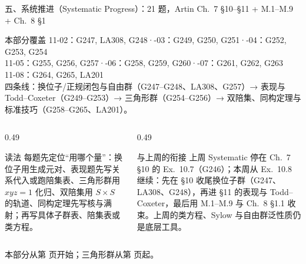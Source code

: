 \documentclass[aspectratio=169,10pt,fontset=none]{ctexbeamer}
\begin{document}
\begin{frame}[t]{五、系统推进（Systematic Progress）：21 题，Artin Ch.~7 \S10--\S11 + M.1--M.9 + Ch.~8 \S1}
  \label{sec:sys}
  \begin{block}{\footnotesize 本部分覆盖}
    \scriptsize
    11-02：G247, LA308, G248\quad·-03：G249, G250, G251\quad·-04：G252, G253, G254\\
    11-05：G255, G256, G257\quad·-06：G258, G259, G260\quad·-07：G261, G262, G263\\
    11-08：G264, G265, LA201\\[2pt]
    四条线：换位子/正规闭包与自由群（G247--G248、LA308、G257）→ 表现与 Todd--Coxeter（G249--G253）→ 三角形群（G254--G256）→ 双陪集、同构定理与标准技巧（G258--G265、LA201）。
  \end{block}
  \begin{columns}[T,onlytextwidth]
    \begin{column}{0.49\textwidth}
      \begin{exampleblock}{\footnotesize 读法}
        \scriptsize
        每题先定位“用哪个量”：换位子用生成元对、表现题先写关系代入或跑陪集表、三角形群用 $xyz=1$ 化归、双陪集用 $S\times S$ 的轨道、同构定理先写核与满射；再写具体子群表、陪集表或类方程。
      \end{exampleblock}
    \end{column}
    \begin{column}{0.49\textwidth}
      \begin{block}{\footnotesize 与上周的衔接}
        \scriptsize
        上周 Systematic 停在 Ch.~7 \S10 的 Ex.~10.7（G246）；本周从 Ex.~10.8 继续：先在 \S10 收尾换位子群（G247、LA308、G248），再进 \S11 的表现与 Todd--Coxeter，最后用 M.1--M.9 与 Ch.~8 \S1.1 收束。上周的类方程、Sylow 与自由群泛性质仍是底层工具。
      \end{block}
    \end{column}
  \end{columns}
  \vspace{0.2em}
  {\scriptsize\color{ink!70} 本部分从第 \pageref{ex:G247} 页开始；三角形群从第 \pageref{ex:G254} 页起。}
\end{frame}

\end{document}
